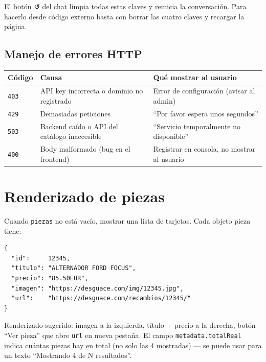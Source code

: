 \documentclass[12pt, a4paper]{article}
\begin{document}
El botón ↺ del chat limpia todas estas claves y reinicia la conversación. Para hacerlo desde código externo basta con borrar las cuatro claves y recargar la página.

\subsection{Manejo de errores HTTP}

\begin{center}
\renewcommand{\arraystretch}{1.25}
\begin{tabularx}{\textwidth}{llX}
\toprule
\textbf{Código} & \textbf{Causa} & \textbf{Qué mostrar al usuario} \\
\midrule
\texttt{403} & API key incorrecta o dominio no registrado & Error de configuración (avisar al admin) \\
\texttt{429} & Demasiadas peticiones & ``Por favor espera unos segundos'' \\
\texttt{503} & Backend caído o API del catálogo inaccesible & ``Servicio temporalmente no disponible'' \\
\texttt{400} & Body malformado (bug en el frontend) & Registrar en consola, no mostrar al usuario \\
\bottomrule
\end{tabularx}
\end{center}

\section{Renderizado de piezas}

Cuando \texttt{piezas} no está vacío, mostrar una lista de tarjetas. Cada objeto pieza tiene:

\begin{lstlisting}[style=json]
{
  "id":     12345,
  "titulo": "ALTERNADOR FORD FOCUS",
  "precio": "85.50EUR",
  "imagen": "https://desguace.com/img/12345.jpg",
  "url":    "https://desguace.com/recambios/12345/"
}
\end{lstlisting}

Renderizado sugerido: imagen a la izquierda, título + precio a la derecha, botón ``Ver pieza'' que abre \texttt{url} en nueva pestaña. El campo \texttt{metadata.totalReal} indica cuántas piezas hay en total (no solo las 4 mostradas) — se puede usar para un texto ``Mostrando 4 de N resultados''.
\end{document}
